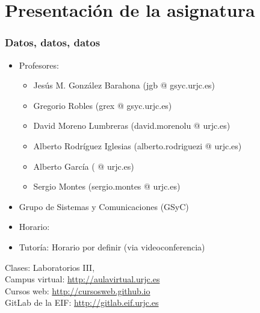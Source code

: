 
\section{Presentación de la asignatura}


\begin{frame}
\frametitle{Datos, datos, datos}

\begin{itemize}
\item Profesores:
  \begin{itemize}
  \item Jesús M. González Barahona (jgb @ gsyc.urjc.es)
  \item Gregorio Robles (grex @ gsyc.urjc.es)
  \item David Moreno Lumbreras (david.morenolu @ urjc.es)
  \item Alberto Rodríguez Iglesias (alberto.rodriguezi @ urjc.es)
  \item Alberto García ( @ urjc.es)
  \item Sergio Montes (sergio.montes @ urjc.es)
  \end{itemize}
\item Grupo de Sistemas y Comunicaciones (GSyC)
\item Horario: \horario
\item Tutoría: Horario por definir (via videoconferencia)
\end{itemize}

\begin{flushright}
  Clases: Laboratorios III, \labo \\
  Campus virtual: {\small \url{http://aulavirtual.urjc.es}} \\
  Cursos web: {\small \url{http://cursosweb.github.io}} \\
  GitLab de la EIF: {\small \url{http://gitlab.eif.urjc.es}} \\
\end{flushright}

\end{frame}


